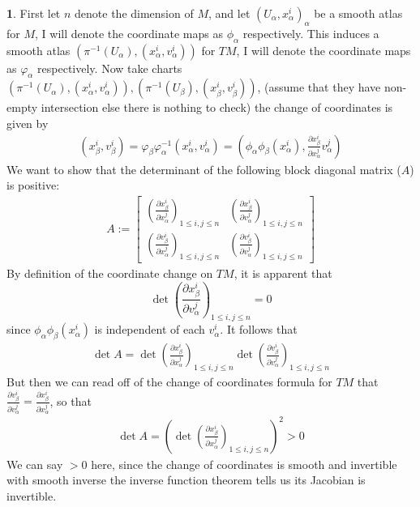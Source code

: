 \documentclass[10.5pt]{article}
\theoremstyle{definition}
\newtheorem{pb}{}
\newcommand{\vp}{\varphi}
\begin{document}
    \begin{pb}
        First let \(n\) denote the dimension of \(M\), and let \((U_\alpha,x_\alpha^i)_\alpha\) be a smooth atlas for \(M\), I will denote the coordinate maps as \(\phi_\alpha\) respectively. This induces a smooth atlas \((\pi^{-1}(U_\alpha),(x_\alpha^i,v_\alpha^i))\) for \(TM\), I will denote the coordinate maps as \(\varphi_\alpha\) respectively. Now take charts \((\pi^{-1}(U_\alpha),(x_\alpha^i,v_\alpha^i)), (\pi^{-1}(U_\beta),(x_\beta^i,v_\beta^i))\), (assume that they have non-empty intersection else there is nothing to check) the change of coordinates is given by
        \begin{align*}
            (x_\beta^i,v_\beta^i) = \vp_\beta \vp_\alpha^{-1}(x_\alpha^i,v_\alpha^i) = (\phi_\alpha \phi_\beta(x_\alpha^i), \frac{\partial x_\beta^i}{\partial x_\alpha^j} v_\alpha^j)
        \end{align*}
        We want to show that the determinant of the following block diagonal matrix (\(A\)) is positive:
        \begin{align*}
            A := \begin{bmatrix} 
                \left(\frac{\partial x_\beta^i}{\partial x_\alpha^j} \right)_{1 \leq i,j \leq n} &
                \left(\frac{\partial x_\beta^i}{\partial v_\alpha^j} \right)_{1 \leq i,j \leq n} \\
                \left(\frac{\partial v_\beta^i}{\partial x_\alpha^j} \right)_{1 \leq i,j \leq n} &
                \left(\frac{\partial v_\beta^i}{\partial v_\alpha^j} \right)_{1 \leq i,j \leq n}
            \end{bmatrix}
        \end{align*}
        By definition of the coordinate change on \(TM\), it is apparent that
        \[\det \left(\frac{\partial x_\beta^i}{\partial v_\alpha^j} \right)_{1 \leq i,j \leq n} = 0\]
        since \(\phi_\alpha \phi_\beta(x_\alpha^i)\) is independent of each \(v_\alpha^i\).
        It follows that
        \begin{align*}
            \det A = \det \left(\frac{\partial x_\beta^i}{\partial x_\alpha^j} \right)_{1 \leq i,j \leq n} \det \left(\frac{\partial v_\beta^i}{\partial v_\alpha^j} \right)_{1 \leq i,j \leq n}
        \end{align*}
        But then we can read off of the change of coordinates formula for \(TM\) that
        \(\frac{\partial v_\beta^i}{\partial v_\alpha^j} = \frac{\partial x_\beta^i}{\partial x_\alpha^j}\), so that
        \begin{align*}
            \det A = \left(\det \left(\frac{\partial x_\beta^i}{\partial x_\alpha^j} \right)_{1 \leq i,j \leq n}\right)^2 > 0
        \end{align*}
        We can say \(> 0\) here, since the change of coordinates is smooth and invertible with smooth inverse the inverse function theorem tells us its Jacobian is invertible.
    \end{pb}
\end{document}
